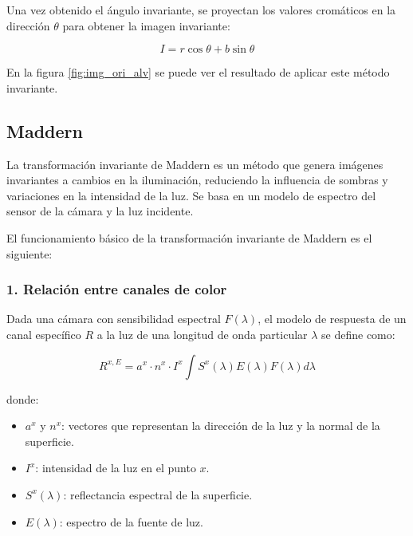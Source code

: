 Una vez obtenido el ángulo invariante, se proyectan los valores cromáticos en la dirección $\theta$ para obtener la imagen invariante:

$$I=r\cos \theta +b\sin \theta$$

En la figura \ref{fig:img_ori_alv} se puede ver el resultado de aplicar este método invariante.

\subsection{Maddern}\label{maddern}

La transformación invariante de Maddern \cite{maddern2014} es un método que genera imágenes invariantes a cambios en la iluminación, reduciendo la influencia de sombras y variaciones en la intensidad de la luz. Se basa en un modelo de espectro del sensor de la cámara y la luz incidente.

El funcionamiento básico de la transformación invariante de Maddern es el siguiente:

\subsubsection{1. Relación entre canales de color}

Dada una cámara con sensibilidad espectral $F(\lambda )$, el modelo de respuesta de un canal específico $R$ a la luz de una longitud de onda particular $\lambda$ se define como:

$$R^{x,E} =a^x \cdot n^x \cdot I^x \int S^x (\lambda )E(\lambda )F(\lambda )d\lambda$$

donde:

\begin{itemize}
\setlength{\itemsep}{-1ex}
   \item{\begin{flushleft} $a^x$ y $n^x$: vectores que representan la dirección de la luz y la normal de la superficie. \end{flushleft}}
   \item{\begin{flushleft} $I^x$: intensidad de la luz en el punto $x$. \end{flushleft}}
   \item{\begin{flushleft} $S^x (\lambda )$: reflectancia espectral de la superficie. \end{flushleft}}
   \item{\begin{flushleft} $E(\lambda )$: espectro de la fuente de luz. \end{flushleft}}
\end{itemize}

